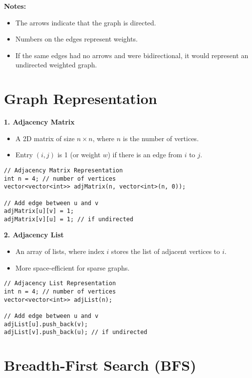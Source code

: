 \documentclass{article}
\begin{document}
\textbf{Notes:}
\begin{itemize}
    \item The arrows indicate that the graph is directed.
    \item Numbers on the edges represent weights.
    \item If the same edges had no arrows and were bidirectional, it would represent an undirected weighted graph.
\end{itemize}

\section{Graph Representation}

\textbf{1. Adjacency Matrix}

\begin{itemize}
    \item A 2D matrix of size $n \times n$, where $n$ is the number of vertices.
    \item Entry $(i, j)$ is 1 (or weight $w$) if there is an edge from $i$ to $j$.
\end{itemize}

\begin{lstlisting}[style=cppstyle]
// Adjacency Matrix Representation
int n = 4; // number of vertices
vector<vector<int>> adjMatrix(n, vector<int>(n, 0));

// Add edge between u and v
adjMatrix[u][v] = 1;
adjMatrix[v][u] = 1; // if undirected
\end{lstlisting}

\textbf{2. Adjacency List}

\begin{itemize}
    \item An array of lists, where index $i$ stores the list of adjacent vertices to $i$.
    \item More space-efficient for sparse graphs.
\end{itemize}

\begin{lstlisting}[style=cppstyle]
// Adjacency List Representation
int n = 4; // number of vertices
vector<vector<int>> adjList(n);

// Add edge between u and v
adjList[u].push_back(v);
adjList[v].push_back(u); // if undirected
\end{lstlisting}

\section{Breadth-First Search (BFS)}
\end{document}
